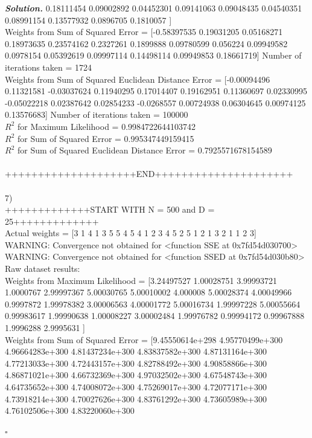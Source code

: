 \documentclass[8pt]{article}
\newenvironment{solution}[1][\it{Solution}]{\textbf{#1. } }{$\square$}
\begin{document}
\begin{solution}
  0.18111454  0.09002892  0.04452301  0.09141063  0.09048435  0.04540351
  0.08991154  0.13577932  0.0896705   0.1810057 ] \\
Weights from Sum of Squared Error = [-0.58397535  0.19031205  0.05168271  0.18973635  0.23574162  0.2327261
  0.1899888   0.09780599  0.056224    0.09949582  0.0978154   0.05392619
  0.09997114  0.14498114  0.09949853  0.18661719] Number of iterations taken =  1724 \\
Weights from Sum of Squared Euclidean Distance Error = [-0.00094496  0.11321581 -0.03037624  0.11940295  0.17014407  0.19162951
  0.11360697  0.02330995 -0.05022218  0.02387642  0.02854233 -0.0268557
  0.00724938  0.06304645  0.00974125  0.13576683] Number of iterations taken =  100000 \\
$R^2$ for Maximum Likelihood = 0.9984722644103742 \\
$R^2$ for Sum of Squared Error = 0.995347449159415 \\
$R^2$ for Sum of Squared Euclidean Distance Error = 0.7925571678154589 \\
\\
++++++++++++++++++++END+++++++++++++++++++++\\
\\
7)\\
+++++++++++++START WITH N = 500 and D = 25+++++++++++++\\
Actual weights =  [3 1 4 1 3 5 5 4 5 4 1 2 3 4 5 2 5 1 2 1 3 2 1 1 2 3] \\
WARNING: Convergence not obtained for <function SSE at 0x7fd54d030700>\\
WARNING: Convergence not obtained for <function SSED at 0x7fd54d030b80>\\
Raw dataset results:\\
Weights from Maximum Likelihood = [3.24497527 1.00028751 3.99993721 1.0000767  2.99997367 5.00030765
 5.00010002 4.000008   5.00028374 4.00049966 0.9997872  1.99978382
 3.00006563 4.00001772 5.00016734 1.99997228 5.00055664 0.99983617
 1.99990638 1.00008227 3.00002484 1.99976782 0.99994172 0.99967888
 1.9996288  2.9995631 ] \\
Weights from Sum of Squared Error = [9.45550614e+298 4.95770499e+300 4.96664283e+300 4.81437234e+300
 4.83837582e+300 4.87131164e+300 4.77213033e+300 4.72443157e+300
 4.82788492e+300 4.90858866e+300 4.86871021e+300 4.66732369e+300
 4.97032502e+300 4.67548743e+300 4.64735652e+300 4.74008072e+300
 4.75269017e+300 4.72077171e+300 4.73918214e+300 4.70027626e+300
 4.83761292e+300 4.73605989e+300 4.76102506e+300 4.83220060e+300

\end{solution}
\end{document}
